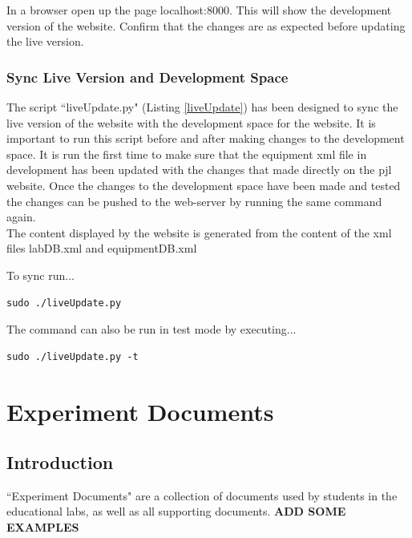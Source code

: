 \documentclass[justified]{book}
\begin{document}
In a browser open up the page localhost:8000. This will show the development version of the website. Confirm that the changes are as expected before updating the live version.

\subsection{Sync Live Version and Development Space}\label{sec:sync}

The script ``liveUpdate.py" (Listing \ref{liveUpdate}) has been designed to sync the live version of the website with the development space for the website. It is important to run this script before and after making changes to the development space. It is run the first time to make sure that the equipment xml file in development has been updated with the changes that made directly on the pjl website. Once the changes to the development space have been made and tested the changes can be pushed to the web-server by running the same command again.\\

The content displayed by the website is generated from the content of the xml files labDB.xml and equipmentDB.xml 

\vspace{12pt}
\noindent To sync run...
\begin{lstlisting}[backgroundcolor = \color{light-gray}]
sudo ./liveUpdate.py
\end{lstlisting}

\noindent The command can also be run in test mode by executing...

\begin{lstlisting}[backgroundcolor = \color{light-gray}]
sudo ./liveUpdate.py -t
\end{lstlisting}


\chapter{Experiment Documents}

\section{Introduction}

``Experiment Documents" are a collection of documents used by students in the educational labs, as well as all supporting documents. {\bf ADD SOME EXAMPLES} \\
\end{document}
